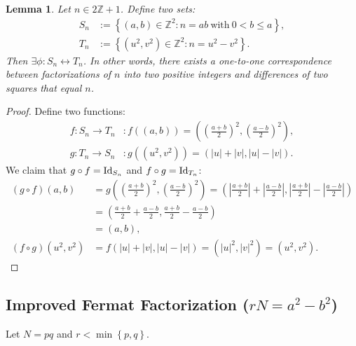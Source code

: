 \documentclass[12pt,openany]{book}
\newtheorem{lemma}[theorem]{Lemma}
\theoremstyle{definition}
\newcommand{\set}[1]{\left\{#1\right\}}
\newcommand{\Z}{\mathbb{Z}}
\newcommand{\of}[1]{\left( #1 \right)}
\newcommand{\abs}[1]{\left\lvert #1 \right\rvert}
\newcommand{\id}{\operatorname{\textnormal{Id}}}
\begin{document}
	\begin{tcolorbox}[colback=white,colframe=lemcolor,arc=5pt,title={\color{white}\bf }]
		\begin{lemma}
			Let $n\in 2\Z+1$. Define two sets: \begin{align*}
			S_n&:=\set{(a,b)\in\Z^2:n=ab\ \text{with}\ 0<b\leq a},\\
			T_n&:=\set{\of{u^2,v^2}\in\Z^2:n=u^2-v^2}.
			\end{align*} Then $\exists\phi:S_n\leftrightarrow T_n$. In other words, there exists a one-to-one correspondence between factorizations of $n$ into two positive integers and differences of two squares that equal $n$.
		\end{lemma}
	\end{tcolorbox}
	\begin{proof}
		Define two functions: \begin{align*}
		f:S_n\to T_n&:f\of{\of{a,b}}=\of{\of{\frac{a+b}{2}}^2,\of{\frac{a-b}{2}}^2},\\
		g:T_n\to S_n&:g\of{\of{u^2,v^2}}=\of{\abs{u}+\abs{v},\abs{u}-\abs{v}}.
		\end{align*} We claim that $g\circ f=\id_{S_n}$ and $f\circ g=\id_{T_n}$:\begin{align*}
		\of{g\circ f}(a,b)&=g\of{\of{\frac{a+b}{2}}^2,\of{\frac{a-b}{2}}^2}=\of{\abs{\frac{a+b}{2}}+\abs{\frac{a-b}{2}},\abs{\frac{a+b}{2}}-\abs{\frac{a-b}{2}}}\\
		&=\of{{\frac{a+b}{2}}+{\frac{a-b}{2}},{\frac{a+b}{2}}-{\frac{a-b}{2}}}\\
		&=\of{a,b},\\
		\of{f\circ g}\of{u^2,v^2}&=f\of{\abs{u}+\abs{v},\abs{u}-\abs{v}}=\of{\abs{u}^2,\abs{v}^2}=\of{u^2,v^2}.
		\end{align*}
	\end{proof}
	
	\subsection{Improved Fermat Factorization ($rN=a^2-b^2$)}
	
	Let $N=pq$ and $r<\min\set{p,q}$.
	
\end{document}
